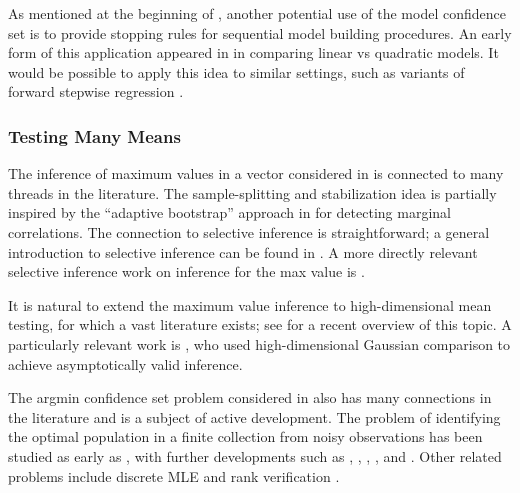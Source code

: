 \documentclass[11pt]{article}
\theoremstyle{plain}
\begin{document}
As mentioned at the beginning of , another potential use of the model confidence set is to provide stopping rules for sequential model building procedures.  An early form of this application appeared in \cite{lei2020cross} in comparing linear vs quadratic models.  It would be possible to apply this idea to similar settings, such as variants of forward stepwise regression \citep{wieczorek2022model,kissel2024forward}.

\subsubsection{Testing Many Means}
The inference of maximum values in a vector considered in  is connected to many threads in the literature.  The sample-splitting and stabilization idea is partially inspired by the ``adaptive bootstrap'' approach in \cite{mckeague2015adaptive} for detecting marginal correlations. The connection to selective inference is straightforward; a general introduction to selective inference can be found in \cite{taylor2015statistical}. A more directly relevant selective inference work on inference for the max value is \cite{reid2017post}.

It is natural to extend the maximum value inference to high-dimensional mean testing, for which a vast literature exists; see \cite{huang2022overview} for a recent overview of this topic.  A particularly relevant work is \cite{chernozhukov2019inference}, who used high-dimensional Gaussian comparison to achieve asymptotically valid inference. 

The argmin confidence set problem considered in  also has many connections in the literature and is a subject of active development.  The problem of identifying the optimal population in a finite collection from noisy observations has been studied as early as \cite{gibbons1977selecting,gupta1979multiple}, with further developments such as \cite{futschik1995confidence}, \cite{hansen2011model}, \cite{mogstad2024inference}, \cite{dey2024anytime}, and \cite{kim2025locally}.
Other related problems include discrete MLE \citep{hammersley1950estimating,choirat2012estimation} and rank verification \citep{hall2009using,xie2009confidence,hung2019rank}.
\end{document}
